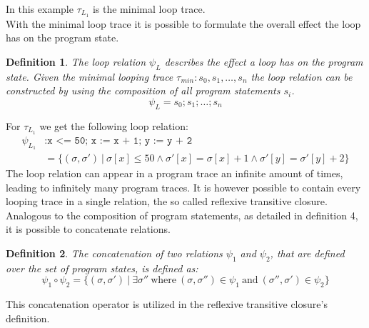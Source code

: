 \documentclass{article}
\newtheorem{mydef}{Definition}
\begin{document}
In this example $\tau_{L_1}$ is the minimal loop trace. \\

With the minimal loop trace it is possible to formulate the overall effect the loop has on the program state.
\begin{mydef}
	The loop relation $\psi_L$ describes the effect a loop has on the program state.
	Given the minimal looping trace $\tau_{min}: s_0, s_1, \ldots, s_{n}$ the loop relation can be constructed by using the composition of all program statements $s_i$.
	\begin{equation*}
		\psi_L = s_0; s_1; \ldots; s_n
	\end{equation*}

\end{mydef}
For $\tau_{L_1}$ we get the following loop relation:
\begin{align*}
 	\psi_{L_1}&:	\texttt{x <= 50; x := x + 1; y := y + 2} \ \\
 	&= \{(\sigma, \sigma')\ |\ \sigma[x] \leq 50 \land \sigma'[x] = \sigma[x] + 1 \land \sigma'[y] = \sigma'[y] + 2 \}
\end{align*}
The loop relation can appear in a program trace an infinite amount of times, leading to infinitely many program traces. It is however possible to contain every looping trace in a single relation, the so called reflexive transitive closure. \\

Analogous to the composition of program statements, as detailed in definition 4, it is possible to concatenate relations.
\begin{mydef}
	The concatenation of two relations $\psi_1$ and $\psi_2$, that are defined over the set of program states, is defined as:
	\begin{equation*}
		\psi_1 \circ \psi_2 = \{(\sigma, \sigma')\ |\ \exists \sigma''\ \text{where}\ (\sigma, \sigma'') \in \psi_1\ \text{and}\ (\sigma'', \sigma') \in \psi_2 \}
	\end{equation*}
\end{mydef}

This concatenation operator is utilized in the reflexive transitive closure's definition.
\end{document}
